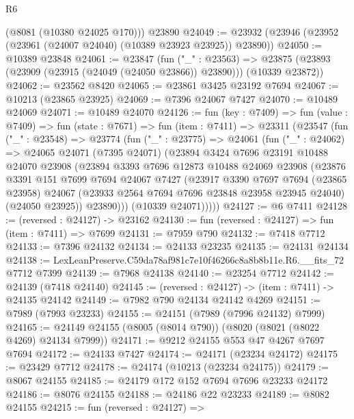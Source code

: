 \begin{lexlean}{R6}
\begin{coremodule}
      (@8081 (@10380 @24025 @170)))
    @23890
@24049 := @23932 (@23946 (@23952 (@23961 (@24007 @24040) (@10389 @23923 @23925)) @23890))
@24050 := @10389 @23848
@24061 := @23847
    (fun ("_" : @23563) =>
    @23875 (@23893 (@23909 (@23915 (@24049 (@24050 @23866)) @23890))) (@10339 @23872))
@24062 := @23562 @8420
@24065 := @23861 @3425 @23192 @7694
@24067 := @10213 (@23865 @23925)
@24069 := @7396 @24067 @7427
@24070 := @10489 @24069
@24071 := @10489 @24070
@24126 := fun (key : @7409) =>
  fun (value : @7409) =>
  fun (state : @7671) =>
  fun (item : @7411) =>
  @23311
    (@23547
      (fun ("_" : @23548) =>
      @23774
        (fun ("_" : @23775) =>
        @24061
          (fun ("_" : @24062) =>
          @24065
            @24071
            (@7395 @24071)
            (@23894
              @3424
              @7696
              @23191
              @10488
              @24070
              @23908
              (@23894
                @3393
                @7696
                @12873
                @10488
                @24069
                @23908
                (@23876
                  @3391
                  @151
                  @7699
                  @7694
                  @24067
                  @7427
                  (@23917
                    @3390
                    @7697
                    @7694
                    (@23865 @23958)
                    @24067
                    (@23933 @2564 @7694 @7696 @23848 @23958 @23945 @24040)
                    (@24050 @23925))
                  @23890)))
            (@10339 @24071)))))
@24127 := @6 @7411
@24128 := (reversed : @24127) -> @23162
@24130 := fun (reversed : @24127) => fun (item : @7411) => @7699
@24131 := @7959 @790
@24132 := @7418 @7712
@24133 := @7396 @24132
@24134 := @24133 @23235
@24135 := @24131 @24134
@24138 := LexLeanPreserve.C59da78af981c7e10f46266c8a8b8b11e.R6.__fits_72 @7712 @7399
@24139 := @7968 @24138
@24140 := @23254 @7712
@24142 := @24139 (@7418 @24140)
@24145 := (reversed : @24127) -> (item : @7411) -> @24135 @24142
@24149 := @7982 @790 @24134 @24142 @4269
@24151 := @7989 (@7993 @23233)
@24155 := @24151 (@7989 (@7996 @24132) @7999)
@24165 := @24149 @24155 (@8005 (@8014 @790)) (@8020 (@8021 (@8022 @4269) @24134 @7999))
@24171 := @9212 @24155 @553 @47 @4267 @7697 @7694
@24172 := @24133 @7427
@24174 := @24171 (@23234 @24172)
@24175 := @23429 @7712
@24178 := @24174 (@10213 (@23234 @24175))
@24179 := @8067 @24155
@24185 := @24179 @172 @152 @7694 @7696 @23233 @24172
@24186 := @8076 @24155
@24188 := @24186 @22 @23233
@24189 := @8082 @24155
@24215 := fun (reversed : @24127) =>

\end{coremodule}
\end{lexlean}
